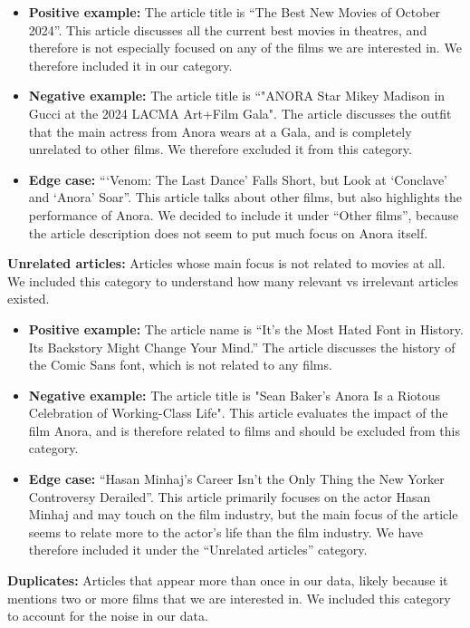 \documentclass[letterpaper]{article} %
\begin{document}
\begin{itemize}
\item\textbf{Positive example:} The article title is “The Best New Movies of October 2024”. This article discusses all the current best movies in theatres, and therefore is not especially focused on any of the films we are interested in. We therefore included it in our category.
\item\textbf{Negative example:} The article title is “"ANORA Star Mikey Madison in Gucci at the 2024 LACMA Art+Film Gala". The article discusses the outfit that the main actress from Anora wears at a Gala, and is completely unrelated to other films. We therefore excluded it from this category.
\item\textbf{Edge case:} “‘Venom: The Last Dance’ Falls Short, but Look at ‘Conclave’ and ‘Anora’ Soar”. This article talks about other films, but also highlights the performance of Anora. We decided to include it under “Other films”, because the article description does not seem to put much focus on Anora itself. 
\end{itemize}
\textbf{Unrelated articles: }Articles whose main focus is not related to movies at all. We included this category to understand how many relevant vs irrelevant articles existed. 
\begin{itemize}
\item\textbf{Positive example:} The article name is “It’s the Most Hated Font in History. Its Backstory Might Change Your Mind.” The article discusses the history of the Comic Sans font, which is not related to any films. 
\item\textbf{Negative example:} The article title is "Sean Baker's Anora Is a Riotous Celebration of Working-Class Life". This article evaluates the impact of the film Anora, and is therefore related to films and should be excluded from this category.
\item\textbf{Edge case:} “Hasan Minhaj’s Career Isn’t the Only Thing the New Yorker Controversy Derailed”. This article primarily focuses on the actor Hasan Minhaj and may touch on the film industry, but the main focus of the article seems to relate more to the actor’s life than the film industry. We have therefore included it under the “Unrelated articles” category.
\end{itemize}
\textbf{Duplicates:} Articles that appear more than once in our data, likely because it mentions two or more films that we are interested in. We included this category to account for the noise in our data.
\end{document}
